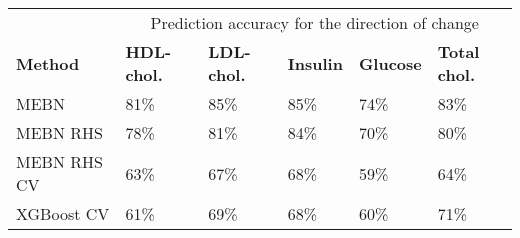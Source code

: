 \documentclass[border=1mm, preview]{standalone}
\begin{document}
\begin{table}[H]
\centering
\begin{tabular}{>{\raggedright\arraybackslash}p{10em}lllll}
\toprule
\multicolumn{1}{c}{ } & \multicolumn{5}{c}{Prediction accuracy for the direction of change} \\
\cmidrule(l{3pt}r{3pt}){2-6}
\textbf{Method} & \textbf{HDL-chol.} & \textbf{LDL-chol.} & \textbf{Insulin} & \textbf{Glucose} & \textbf{Total chol.}\\
\midrule
MEBN & 81\% & 85\% & 85\% & 74\% & 83\%\\
MEBN RHS & 78\% & 81\% & 84\% & 70\% & 80\%\\
MEBN RHS CV & 63\% & 67\% & 68\% & 59\% & 64\%\\
XGBoost CV & 61\% & 69\% & 68\% & 60\% & 71\%\\
\bottomrule
\end{tabular}
\end{table}
\end{document}
